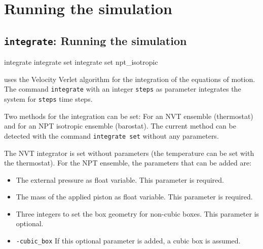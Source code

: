 %  
%   
%  
%  
%
\chapter{Running the simulation}
\label{chap:run}

\section{\texttt{integrate}: Running the simulation}

\begin{essyntax}
   integrate 
   integrate set 
   integrate set npt_isotropic    
\end{essyntax}

\es uses the Velocity Verlet algorithm for the integration of the
equations of motion. The command \texttt{integrate} with an integer
\texttt{steps} as parameter integrates the system for \texttt{steps}
time steps.

Two methods for the integration can be set: For an NVT ensemble
(thermostat) and for an NPT isotropic ensemble (barostat). The current
method can be detected with the command \texttt{integrate set} without
any parameters.

The NVT integrator is set without parameters (the temperature can be
set with the thermostat). For the NPT ensemble, the parameters that
can be added are:

\begin{itemize}
\item {} The external pressure as float variable. This parameter is required.
\item {} The mass of the applied piston as float variable. This parameter is required.
\item {} Three integers to set the box geometry for non-cubic boxes. This parameter is optional.
\item \texttt{-cubic_box} If this optional parameter is added, a cubic box is assumed.
\end{itemize}

